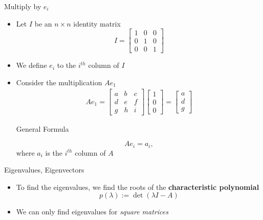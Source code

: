 \documentclass[10pt]{beamer}
\begin{document}
\begin{frame}{Multiply by $e_i$}

\begin{itemize}
    \item Let $I$ be an $n\times n$ identity matrix 
        $$
        I = \begin{bmatrix}
            1 & 0 & 0\\
            0 & 1 & 0\\
            0 & 0 & 1
        \end{bmatrix}
        $$

    \item We define $e_i$ to the $i^{th}$ column of $I$

    \item Consider the multiplication $Ae_1$
    \begin{align*}
        Ae_1 = \begin{bmatrix}
            a & b & c\\
            d & e & f\\
            g & h &i
        \end{bmatrix} \begin{bmatrix}
            1\\0 \\0
        \end{bmatrix} = \begin{bmatrix}
            a \\ d \\ g
        \end{bmatrix}
    \end{align*}

    \begin{block}{General Formula}
    
    $$
    A e_i = a_i,
    $$
    where $a_i$ is the $i^{th}$ column of $A$
    \end{block}
\end{itemize}
    
\end{frame}


\begin{frame}{Eigenvalues, Eigenvectors}


\begin{itemize}

\item To find the eigenvalues, we find the roots of the \textbf{characteristic polynomial}
$$p(\lambda) := \det(\lambda I - A)$$

\item We can only find eigenvalues for \emph{square matrices}

\end{itemize}
\end{frame}
\end{document}
